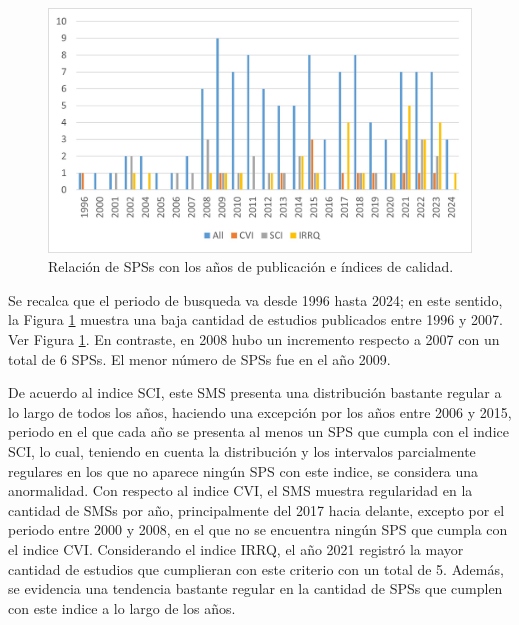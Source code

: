 \begin{figure}[htbp]
	\centering
	\vspace{10pt}
	\includegraphics[scale=0.7]{resources/figures/SPSsBYearsAndIndexes.jpg}
	\vspace{6pt}
	\caption{Relación de SPSs con los años de publicación e índices de calidad.}
	\label{fig:SPSsByYearsAndIndexes}
\end{figure}

Se recalca que el periodo de busqueda va desde 1996 hasta 2024; en este sentido, la Figura \ref{fig:SPSsByYearsAndIndexes} muestra una baja cantidad de estudios publicados entre 1996 y 2007. Ver Figura \ref{fig:SPSsByYearsAndIndexes}. En contraste, en 2008 hubo un incremento respecto a 2007 con un total de 6 SPSs. El menor número de SPSs fue en el año 2009.

De acuerdo al indice SCI, este SMS presenta una distribución bastante regular a lo largo de todos los años, haciendo una excepción por los años entre 2006 y 2015, periodo en el que cada año se presenta al menos un SPS que cumpla con el indice SCI, lo cual, teniendo en cuenta la distribución y los intervalos parcialmente regulares en los que no aparece ningún SPS con este indice, se considera una anormalidad. Con respecto al indice CVI, el SMS muestra regularidad en la cantidad de SMSs por año, principalmente del 2017 hacia delante, excepto por el periodo entre 2000 y 2008, en el que no se encuentra ningún SPS que cumpla con el indice CVI. Considerando el indice IRRQ, el año 2021 registró la mayor cantidad de estudios que cumplieran con este criterio con un total de 5. Además, se evidencia una tendencia bastante regular en la cantidad de SPSs que cumplen con este indice a lo largo de los años.

